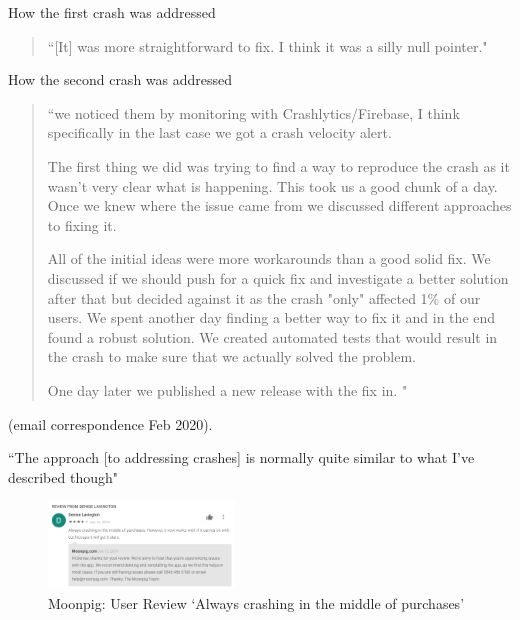How the first crash was addressed
\begin{quote}
    ``[It] was more straightforward to fix. I think it was a silly null pointer."
\end{quote}

How the second crash was addressed
\begin{quote}
    ``we noticed them by monitoring with Crashlytics/Firebase, I think specifically in the last case we got a crash velocity alert.

      The first thing we did was trying to find a way to reproduce the crash as it wasn't very clear what is happening. This took us a good chunk of a day. Once we knew where the issue came from we discussed different approaches to fixing it. 
      
      All of the initial ideas were more workarounds than a good solid fix. We discussed if we should push for a quick fix and investigate a better solution after that but decided against it as the crash "only" affected 1\% of our users. We spent another day finding a better way to fix it and in the end found a robust solution. We created automated tests that would result in the crash to make sure that we actually solved the problem.
      
      One day later we published a new release with the fix in. "
\end{quote} (email correspondence  Feb 2020).

``The approach [to addressing crashes] is normally quite similar to what I've described though"



\begin{figure}
    \includegraphics[width=0.44\textwidth]{images/google-play/Denise-Lavington-Review-moonpig-crashing-2019.png}
  \caption[Moonpig: User Review in Google Play `Always crashes...']{Moonpig: User Review `Always crashing in the middle of purchases'}
  \label{fig:gp-review-denise-lavington-always-crashes}
\end{figure}

